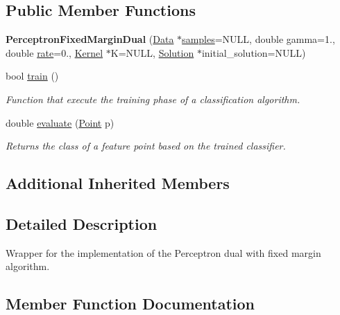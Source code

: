 \subsection*{Public Member Functions}
\begin{DoxyCompactItemize}
\item 
\mbox{\label{class_perceptron_fixed_margin_dual_ac58bf42eac090bba4221e761fbe7fd0c}} 
{\bfseries Perceptron\+Fixed\+Margin\+Dual} (\hyperlink{class_data}{Data} $\ast$\hyperlink{class_classifier_a515c225d0da93df02ca79f9f87811d17}{samples}=N\+U\+LL, double gamma=1., double \hyperlink{class_classifier_af9867e5919742de1303dd971a9a1c19a}{rate}=0., \hyperlink{class_kernel}{Kernel} $\ast$K=N\+U\+LL, \hyperlink{class_solution}{Solution} $\ast$initial\+\_\+solution=N\+U\+LL)
\item 
bool \hyperlink{class_perceptron_fixed_margin_dual_aa095c90a3d04f70e1cf2e38e2afa769b}{train} ()
\begin{DoxyCompactList}\small\item\em Function that execute the training phase of a classification algorithm. \end{DoxyCompactList}\item 
double \hyperlink{class_perceptron_fixed_margin_dual_a1370fdbc95bf728f82a83f219be32d23}{evaluate} (\hyperlink{class_point}{Point} p)
\begin{DoxyCompactList}\small\item\em Returns the class of a feature point based on the trained classifier. \end{DoxyCompactList}\end{DoxyCompactItemize}
\subsection*{Additional Inherited Members}


\subsection{Detailed Description}
Wrapper for the implementation of the Perceptron dual with fixed margin algorithm. 

\subsection{Member Function Documentation}
\mbox{\label{class_perceptron_fixed_margin_dual_a1370fdbc95bf728f82a83f219be32d23}} 
